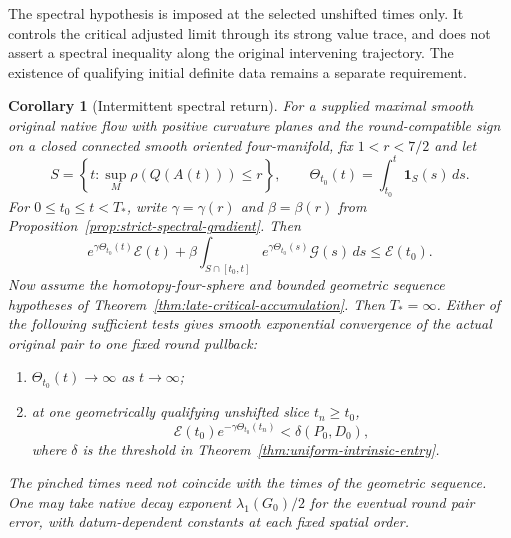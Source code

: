 \documentclass[11pt]{article}
\numberwithin{equation}{section}
\newtheorem{corollary}[theorem]{Corollary}
\theoremstyle{definition}
\theoremstyle{remark}
\begin{document}
The spectral hypothesis is imposed at the selected unshifted
times only. It controls the critical adjusted limit through
its strong value trace, and does not assert a spectral
inequality along the original intervening trajectory.
The existence of qualifying initial definite data remains
a separate requirement.


\begin{corollary}[Intermittent spectral return]
\label{cor:intermittent-spectral-return}
For a supplied maximal smooth original native flow with
positive curvature planes and the round-compatible sign on
a closed connected smooth oriented four-manifold, fix
$1<r<7/2$ and let
\[
 S=\left\{t:\sup_M\rho(Q(A(t)))\le r\right\},\qquad
 \Theta_{t_0}(t)=\int_{t_0}^t\mathbf1_S(s)\,ds.
\]
For $0\le t_0\le t<T_*$, write $\gamma=\gamma(r)$ and
$\beta=\beta(r)$ from
Proposition~\ref{prop:strict-spectral-gradient}. Then
\begin{equation}\label{eq:intermittent-spectral-energy}
 e^{\gamma\Theta_{t_0}(t)}\mathscr E(t)
 +\beta\int_{S\cap[t_0,t]}e^{\gamma\Theta_{t_0}(s)}\mathscr G(s)\,ds
 \le\mathscr E(t_0).
\end{equation}
Now assume the homotopy-four-sphere and bounded geometric
sequence hypotheses of Theorem~\ref{thm:late-critical-accumulation}.
Then $T_*=\infty$. Either of the following sufficient tests
gives smooth exponential convergence of the actual original
pair to one fixed round pullback:
\begin{enumerate}
\item $\Theta_{t_0}(t)\to\infty$ as $t\to\infty$;
\item at one geometrically qualifying unshifted slice $t_n\ge t_0$,
\begin{equation}\label{eq:finite-spectral-entry-test}
 \mathscr E(t_0)e^{-\gamma\Theta_{t_0}(t_n)}<\delta(P_0,D_0),
\end{equation}
where $\delta$ is the threshold in
Theorem~\ref{thm:uniform-intrinsic-entry}.
\end{enumerate}
The pinched times need not coincide with the times of the
geometric sequence. One may take native decay exponent
$\lambda_1(G_0)/2$ for the eventual round pair error, with
datum-dependent constants at each fixed spatial order.
\end{corollary}
\end{document}
